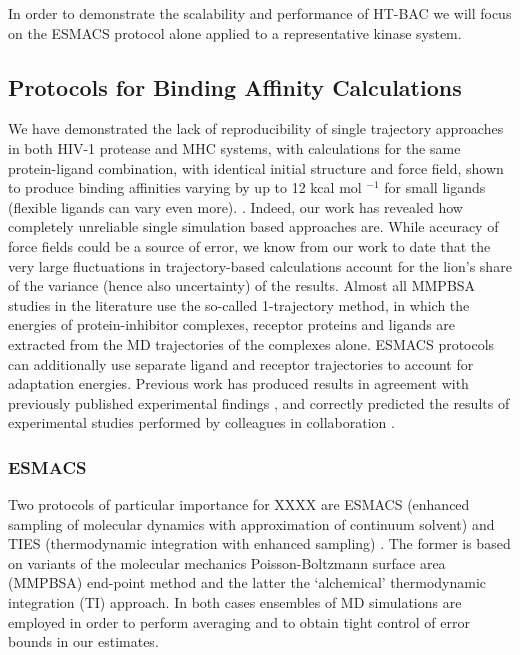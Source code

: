 In order to demonstrate the scalability and performance of HT-BAC we will focus on the ESMACS protocol alone applied to a representative kinase system.

\subsection{Protocols for Binding Affinity Calculations}

We have demonstrated the lack of reproducibility of single trajectory
approaches in both HIV-1 protease and MHC systems, with calculations for the
same protein-ligand combination, with identical initial structure and force
field, shown to produce binding affinities varying by up to 12 kcal mol
$^{-1}$ for small ligands (flexible ligands can vary even more).
\cite{Wan2015, Sadiq2010, Wright2014}. Indeed, our work has revealed how
completely unreliable single simulation based approaches are. While accuracy
of force fields could be a source of error, we know from our work to date
\cite{} that the very large fluctuations in trajectory-based calculations
account for the lion’s share of the variance (hence also uncertainty) of the
results. Almost all MMPBSA studies in the literature use the so-called
1-trajectory method, in which the energies of protein-inhibitor complexes,
receptor proteins and ligands are extracted from the MD trajectories of the
complexes alone. ESMACS protocols can additionally use separate ligand and
receptor trajectories to account for adaptation energies. Previous work has
produced results in agreement with previously published experimental findings
\cite{Sadiq2010, Wan2011, Wright2014, Bhati2017, Wan2017brd4, Wan2017trk}, and
correctly predicted the results of experimental studies performed by
colleagues in collaboration \cite{Bunney2015}.


\subsubsection*{ESMACS}

Two protocols of particular importance for XXXX are ESMACS (enhanced sampling
of molecular dynamics with approximation of continuum
solvent)\cite{Wan2017brd4} and TIES (thermodynamic integration with enhanced
sampling) \cite{Bhati2017}. The former is based on variants of the molecular
mechanics Poisson-Boltzmann surface area (MMPBSA) end-point method and the
latter the `alchemical' thermodynamic integration (TI) approach. In both cases
ensembles of MD simulations are employed in order to perform averaging and to
obtain tight control of error bounds in our estimates.


